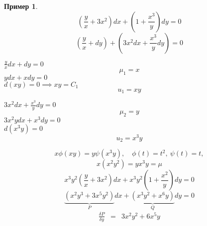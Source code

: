 \documentclass[11pt,a4paper,oneside]{report}
\theoremstyle{definition}
\newtheorem{example}{Пример}
\theoremstyle{plain}
\theoremstyle{remark}
\begin{document}
\begin{example}
    \begin{equation*}
        (\frac{y}{x} + 3x^2)dx + (1 + \frac{x^3}{y})dy = 0
    \end{equation*}
    \begin{equation*}
        (\frac{y}{x} + dy) + (3x^2 dx + \frac{x^3}{y}dy) = 0
    \end{equation*}
    \begin{minipage}{0.4\textwidth}
        $\frac{y}{x}dx + dy = 0$
        \begin{equation*}
            \mu_1 = x
        \end{equation*}
        $ydx + xdy = 0$ \\
        $d(xy) = 0 \implies xy = C_1$ \\
        \begin{equation*}
            u_1 = xy
        \end{equation*}
    \end{minipage}
    \hfill
    \begin{minipage}{0.4\textwidth}
        $3x^2dx + \frac{x^3}{y}dy = 0$
        \begin{equation*}
            \mu_2 = y
        \end{equation*}
        $3x^2ydx + x^3dy = 0$ \\
        $d(x^3y) = 0$ \\
        \begin{equation*}
            u_2 = x^3y
        \end{equation*}
    \end{minipage}
    \begin{equation*}
        x\phi(xy) = y \psi(x^3y),\quad \phi(t) = t^2, \ \psi(t) = t,
    \end{equation*}
    \begin{equation*}
        x(x^2y^2) = yx^3y = \mu
    \end{equation*}
    \begin{equation*}
        x^3y^2\left(\frac{y}{x}+3x^2\right)dx + x^3y^2\left(1 + \frac{x^2}{y}\right)dy = 0
    \end{equation*}
    \begin{equation*}
        \underbrace{(x^2y^3 + 3x^5y^2)}_{P}dx + \underbrace{(x^3y^2 + x^6y)}_{Q}dy = 0
    \end{equation*}
    \begin{equation*}
        \begin{array}{ccc}
            \frac{\delta P}{\delta y} & = & 3x^2y^2 + 6x^5y \\

\end{array}
\end{equation*}
\end{example}
\end{document}
